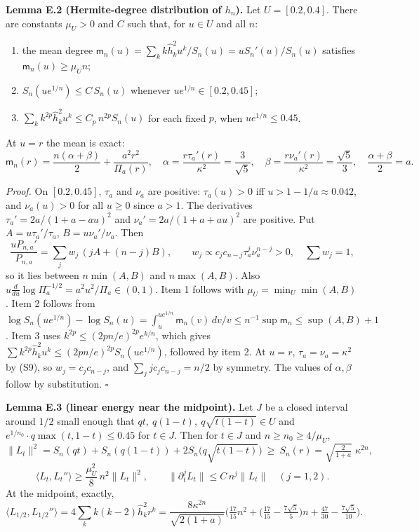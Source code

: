 \documentclass[
  british,
  10pt,
]{article}
\providecommand{\tightlist}{%
  \setlength{\itemsep}{0pt}\setlength{\parskip}{0pt}}
\begin{document}
\textbf{Lemma E.2 (Hermite-degree distribution of \(h_n\)).} Let
\(U=[0.2,0.4]\). There are constants \(\mu_U>0\) and \(C\) such that,
for \(u\in U\) and all \(n\):

\begin{enumerate}
\def\labelenumi{\arabic{enumi}.}
\tightlist
\item
  the mean degree
  \(\mathsf m_n(u)=\sum_kk\hat h_k^2u^k/S_n(u)=uS_n'(u)/S_n(u)\)
  satisfies \(\mathsf m_n(u)\ge\mu_Un\);
\item
  \(S_n(ue^{1/n})\le C\,S_n(u)\) whenever \(ue^{1/n}\in[0.2,0.45]\);
\item
  \(\sum_k k^{2p}\hat h_k^2u^k\le C_p\,n^{2p}S_n(u)\) for each fixed
  \(p\), when \(ue^{1/n}\le0.45\).
\end{enumerate}

At \(u=r\) the mean is exact: \[
\mathsf m_n(r)=\frac{n(\alpha+\beta)}2+\frac{a^2r^2}{\Pi_a(r)},\quad
\alpha=\frac{r\tau_a'(r)}{\kappa^2}=\frac3{\sqrt5},\quad
\beta=\frac{r\nu_a'(r)}{\kappa^2}=\frac{\sqrt5}3,\quad
\frac{\alpha+\beta}2=a .
\tag{E5}
\]

\emph{Proof.} On \([0.2,0.45]\), \(\tau_a\) and \(\nu_a\) are positive:
\(\tau_a(u)>0\) iff \(u>1-1/a\approx0.042\), and \(\nu_a(u)>0\) for all
\(u\ge0\) since \(a>1\). The derivatives \(\tau_a'=2a/(1+a-au)^2\) and
\(\nu_a'=2a/(1+a+au)^2\) are positive. Put \(A=u\tau_a'/\tau_a\),
\(B=u\nu_a'/\nu_a\). Then \[
\frac{uP_{n,a}'}{P_{n,a}}=\sum_jw_j\,(jA+(n-j)B),\qquad
w_j\propto c_jc_{n-j}\tau_a^j\nu_a^{n-j}>0,\quad\sum w_j=1,
\] so it lies between \(n\min(A,B)\) and \(n\max(A,B)\). Also
\(u\frac{d}{du}\log\Pi_a^{-1/2}=a^2u^2/\Pi_a\in(0,1)\). Item 1 follows
with \(\mu_U=\min_U\min(A,B)\). Item 2 follows from
\(\log S_n(ue^{1/n})-\log S_n(u)=\int_u^{ue^{1/n}}\mathsf m_n(v)\,dv/v\le n^{-1}\sup\mathsf m_n\le\sup(A,B)+1\).
Item 3 uses \(k^{2p}\le(2pn/e)^{2p}e^{k/n}\), which gives
\(\sum k^{2p}\hat h_k^2u^k\le(2pn/e)^{2p}S_n(ue^{1/n})\), followed by
item 2. At \(u=r\), \(\tau_a=\nu_a=\kappa^2\) by (S9), so
\(w_j=c_jc_{n-j}\), and \(\sum_jjc_jc_{n-j}=n/2\) by symmetry. The
values of \(\alpha,\beta\) follow by substitution. \(\square\)

\textbf{Lemma E.3 (linear energy near the midpoint).} Let \(J\) be a
closed interval around \(1/2\) small enough that
\(qt,\ q(1-t),\ q\sqrt{t(1-t)}\in U\) and
\(e^{1/n_0}\cdot q\max(t,1-t)\le0.45\) for \(t\in J\). Then for
\(t\in J\) and \(n\ge n_0\ge4/\mu_U\), \[
\|L_t\|^2=S_n(qt)+S_n(q(1-t))+2S_n\big(q\sqrt{t(1-t)}\big)\ \ge\ S_n(r)=\sqrt{\tfrac2{1+a}}\;\kappa^{2n},
\tag{E6}
\] \[
\langle L_t,L_t''\rangle\ge\frac{\mu_U^2}{8}\,n^2\|L_t\|^2,\qquad
\|\partial_t^jL_t\|\le C\,n^j\|L_t\|\quad(j=1,2).
\tag{E7}
\] At the midpoint, exactly, \[
\langle L_{1/2},L_{1/2}''\rangle
=4\sum_kk(k-2)\hat h_k^2r^k
=\frac{8\kappa^{2n}}{\sqrt{2(1+a)}}\Big(\tfrac{17}{15}n^2+\big(\tfrac{17}{15}-\tfrac{7\sqrt5}5\big)n+\tfrac{47}{30}-\tfrac{7\sqrt5}{10}\Big).
\tag{E8}
\]
\end{document}
